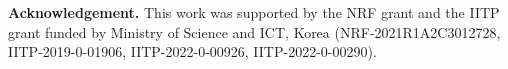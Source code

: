 \documentclass[runningheads]{llncs}
\begin{document}
\vfill
{\small
\noindent \textbf{Acknowledgement.} 
This work was supported by 
the NRF grant and  the IITP grant funded by Ministry of Science and ICT, Korea
(NRF-2021R1A2C3012728,  IITP-2019-0-01906,     IITP-2022-0-00926,     IITP-2022-0-00290).    }
 





\end{document}
